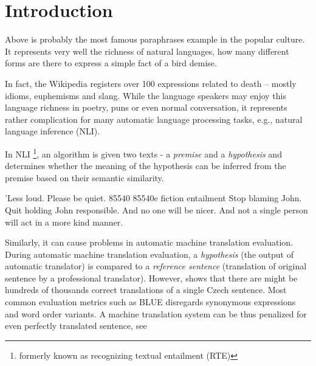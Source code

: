\chapter*{Introduction}



Above is probably the most famous paraphrases example in the popular culture. 
It represents very well the richness of natural languages, how many different forms are there to express a simple fact of a bird demise. 

In fact, the Wikipedia registers over 100 expressions related to death -- mostly idioms, euphemisms and slang.  \citep{wiki:death} 
While the language speakers may enjoy this language richness in poetry, puns or even normal conversation, it represents rather complication for many automatic language processing tasks, e.g., natural language inference (NLI).

In NLI \footnote{formerly known as recognizing textual entailment (RTE)}, an algorithm is given two texts - a \emph{premise} and a \emph{hypothesis} and determines whether the meaning of the hypothesis can be inferred from the premise based on their semantic similarity. \citep{dagan:2005}


'Less loud.     Please be quiet.        85540   85540e  fiction entailment
Stop blaming John.      Quit holding John responsible.
And no one will be nicer.       And not a single person will act in a more kind manner.


Similarly, it can cause problems in automatic machine translation evaluation. 
During automatic machine translation evaluation, a \emph{hypothesis} (the output of automatic translator) is compared to a \emph{reference sentence} (translation of original sentence by a professional translator). 
However, \citep{bojar-scratching} shows that there are might be hundreds of thousands correct translations of a single Czech sentence.
Most common evaluation metrics such as BLUE \citep{bleu} disregards synonymous expressions and word order variants.
A machine translation system can be thus penalized for even perfectly translated sentence, see 

